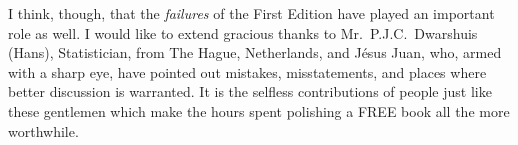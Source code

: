 I think, though, that the \emph{failures} of the First Edition have played an important role as well. I would like to extend gracious thanks to Mr.\ P.J.C.\ Dwarshuis (Hans), Statistician, from The Hague, Netherlands, and J\'{e}{}sus Juan, who, armed with a sharp eye, have pointed out mistakes, misstatements, and places where better discussion is warranted.  It is the selfless contributions of people just like these gentlemen which make the hours spent polishing a FREE book all the more worthwhile.


\vfill{}
\cleardoublepage
{}
{}
\listoffigures

\vfill{}
\cleardoublepage
{}
{}
\listoftables

